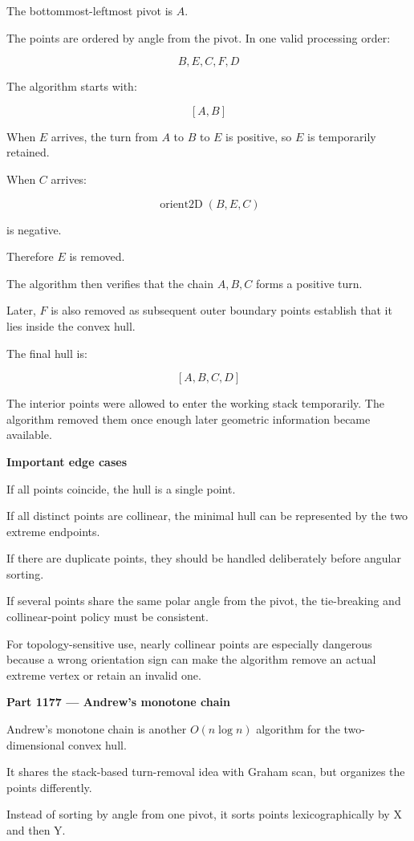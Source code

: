 The bottommost-leftmost pivot is \(A\).

The points are ordered by angle from the pivot. In one valid processing order:

\[
B,E,C,F,D
\]

The algorithm starts with:

\[
[A,B]
\]

When \(E\) arrives, the turn from \(A\) to \(B\) to \(E\) is positive, so \(E\) is temporarily retained.

When \(C\) arrives:

\[
\operatorname{orient2D}(B,E,C)
\]

is negative.

Therefore \(E\) is removed.

The algorithm then verifies that the chain \(A,B,C\) forms a positive turn.

Later, \(F\) is also removed as subsequent outer boundary points establish that it lies inside the convex hull.

The final hull is:

\[
\boxed{[A,B,C,D]}
\]

The interior points were allowed to enter the working stack temporarily. The algorithm removed them once enough later geometric information became available.

\textbf{Important edge cases}

If all points coincide, the hull is a single point.

If all distinct points are collinear, the minimal hull can be represented by the two extreme endpoints.

If there are duplicate points, they should be handled deliberately before angular sorting.

If several points share the same polar angle from the pivot, the tie-breaking and collinear-point policy must be consistent.

For topology-sensitive use, nearly collinear points are especially dangerous because a wrong orientation sign can make the algorithm remove an actual extreme vertex or retain an invalid one.

\textbf{Part 1177 --- Andrew's monotone chain}

Andrew's monotone chain is another \(O(n\log n)\) algorithm for the two-dimensional convex hull.

It shares the stack-based turn-removal idea with Graham scan, but organizes the points differently.

Instead of sorting by angle from one pivot, it sorts points lexicographically by X and then Y.

